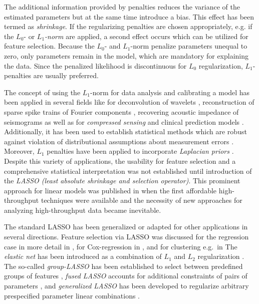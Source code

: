 \documentclass{bioinfo}
\begin{document}
The additional information provided by penalties reduces the variance of the estimated parameters but at the same time introduce a bias. This effect has been termed as \emph{shrinkage}. 
If the regularizing penalties are chosen appropriately, e.g. if the \emph{$L_0$}- or \emph{$L_1$-norm} are applied, a second effect occurs which can be utilized for feature selection. 
Because the $L_0$- and $L_1$-norm penalize parameters unequal to zero, only parameters remain in the model, which are mandatory for explaining the data. 
Since the penalized likelihood is discontinuous for $L_0$ regularization, $L_1$-penalties are usually preferred.

The concept of using the $L_1$-norm for data analysis and calibrating a model has been applied in several fields like for deconvolution of wavelets \citep{Taylor1979}, 
reconstruction of sparse spike trains of Fourier components \citep{Levy1981}, recovering acoustic impedance of seismograms \citep{Oldenburg1983} 
as well as for \emph{compressed sensing} \citep{Candes2008,Cheng2015} and clinical prediction models \citep{Hothorn2006}. 
Additionally, it has been used to establish statistical methods which are robust against violation of distributional assumptions about measurement errors \citep{Claerbout73, Barrodale1973}. Moreover, $L_1$ penalties have been applied to incorporate \emph{Laplacian priors} \citep{xx}. 
%
Despite this variety of applications, the usability for feature selection and a comprehensive statistical interpretation was not established until introduction of the 
\emph{LASSO (least absolute shrinkage and selection operator)}. 
This prominent approach for linear models was published in \cite{Tibshirani94} when the first affordable high-throughput techniques were available and the necessity of new approaches for analyzing high-throughput data became inevitable.

The standard LASSO has been generalized or adapted for other applications in several directions. 
Feature selection via LASSO was discussed for the regression case in more detail in \cite{tibshirani96}, for Cox-regression in \cite{Tibshirani1997}, and for clustering e.g.~in \cite{Witten2010}
The \emph{elastic net} has been introduced as a combination of $L_1$ and $L_2$ regularization \citep{Zou05}. 
The so-called  \emph{group-LASSO} has been established to select between predefined groups of features \citep{Yuan2006}, \emph{fused LASSO} accounts for additional constraints of pairs of parameters \citep{Tibshirani2005}, and  \emph{generalized LASSO} has been developed to regularize arbitrary prespecified parameter linear combinations \citep{Tibshirani2011}.
\end{document}
